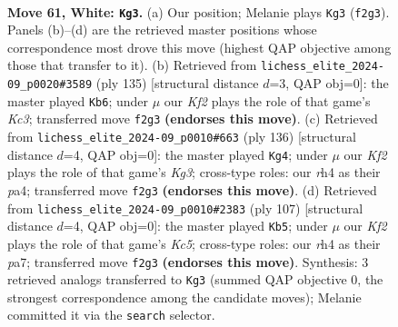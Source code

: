 \documentclass[11pt]{article}
\begin{document}
\clearpage

\begin{figure}[p]\centering
\begin{subfigure}{0.46\textwidth}\centering
\resizebox{\linewidth}{!}{%
\newchessgame
\chessboard[
  setfen={8/8/2pp4/p4k2/7r/8/5K2/8 w - - 0 61},
  showmover=false,
  pgfstyle=straightmove, color=movearrow, markmove={f2-g3}
]}
\caption{}
\end{subfigure}\hfill
\begin{subfigure}{0.46\textwidth}\centering
\resizebox{\linewidth}{!}{%
\newchessgame
\chessboard[
  setfen={4K3/8/2k5/R7/8/1P5P/8/8 b - - 0 68},
  showmover=false,
  pgfstyle=straightmove, color=movearrow, markmove={c6-b6}
]}
\caption{}
\end{subfigure}
\\[4pt]
\begin{subfigure}{0.46\textwidth}\centering
\resizebox{\linewidth}{!}{%
\newchessgame
\chessboard[
  setfen={8/8/p7/6p1/p7/6K1/1k6/8 w - - 0 69},
  showmover=false,
  pgfstyle=straightmove, color=movearrow, markmove={g3-g4}
]}
\caption{}
\end{subfigure}\hfill
\begin{subfigure}{0.46\textwidth}\centering
\resizebox{\linewidth}{!}{%
\newchessgame
\chessboard[
  setfen={8/P7/1P5K/8/2k5/8/5P2/8 b - - 0 54},
  showmover=false,
  pgfstyle=straightmove, color=movearrow, markmove={c4-b5}
]}
\caption{}
\end{subfigure}
\caption{\textbf{Move 61, White: \texttt{Kg3}.} (a) Our position; Melanie plays \texttt{Kg3} (\texttt{f2g3}). Panels (b)--(d) are the retrieved master positions whose correspondence most drove this move (highest QAP objective among those that transfer to it). (b) Retrieved from \texttt{lichess\_elite\_2024-09\_p0020\#3589} (ply 135) [structural distance $d$=3, QAP obj=0]: the master played \texttt{Kb6}; under $\mu$ our \emph{Kf2} plays the role of that game's \emph{Kc3}; transferred move \texttt{f2g3} \textbf{(endorses this move)}. (c) Retrieved from \texttt{lichess\_elite\_2024-09\_p0010\#663} (ply 136) [structural distance $d$=4, QAP obj=0]: the master played \texttt{Kg4}; under $\mu$ our \emph{Kf2} plays the role of that game's \emph{Kg3}; cross-type roles: our \emph{r}h4 as their \emph{p}a4; transferred move \texttt{f2g3} \textbf{(endorses this move)}. (d) Retrieved from \texttt{lichess\_elite\_2024-09\_p0010\#2383} (ply 107) [structural distance $d$=4, QAP obj=0]: the master played \texttt{Kb5}; under $\mu$ our \emph{Kf2} plays the role of that game's \emph{Kc5}; cross-type roles: our \emph{r}h4 as their \emph{p}a7; transferred move \texttt{f2g3} \textbf{(endorses this move)}. Synthesis: 3 retrieved analogs transferred to \texttt{Kg3} (summed QAP objective 0, the strongest correspondence among the candidate moves); Melanie committed it via the \texttt{search} selector.}
\label{fig:thought-m120}
\end{figure}
\end{document}

